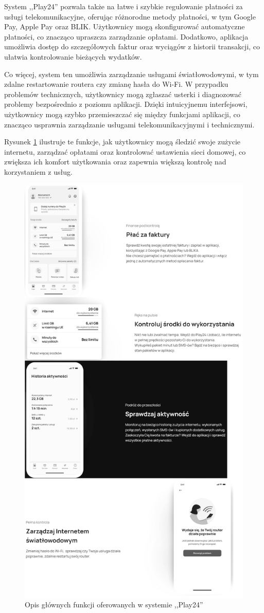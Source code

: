 System ,,Play24'' pozwala także na łatwe i szybkie regulowanie płatności za usługi telekomunikacyjne, oferując różnorodne metody płatności, w tym Google Pay, Apple Pay oraz BLIK. Użytkownicy mogą skonfigurować automatyczne płatności, co znacząco upraszcza zarządzanie opłatami. Dodatkowo, aplikacja umożliwia dostęp do szczegółowych faktur oraz wyciągów z historii transakcji, co ułatwia kontrolowanie bieżących wydatków.

Co więcej, system ten umożliwia zarządzanie usługami światłowodowymi, w tym zdalne restartowanie routera czy zmianę hasła do Wi-Fi. W przypadku problemów technicznych, użytkownicy mogą zgłaszać usterki i diagnozować problemy bezpośrednio z poziomu aplikacji. Dzięki intuicyjnemu interfejsowi, użytkownicy mogą szybko przemieszczać się między funkcjami aplikacji, co znacząco usprawnia zarządzanie usługami telekomunikacyjnymi i technicznymi.

Rysunek \ref{fig:play24_manual} ilustruje te funkcje, jak użytkownicy mogą śledzić swoje zużycie internetu, zarządzać opłatami oraz kontrolować ustawienia sieci domowej, co zwiększa ich komfort użytkowania oraz zapewnia większą kontrolę nad korzystaniem z usług.

\begin{figure}[ht]
    \centering
    \includegraphics[width=0.6\linewidth]{rys01/play_manual}
    \caption{Opis głównych funkcji oferowanych w systemie ,,Play24''}
    \label{fig:play24_manual}
\end{figure}

